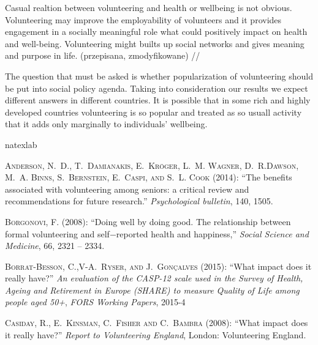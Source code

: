 \documentclass[10pt, letterpaper]{article}
\begin{document}
\begin{spacing}{1.4}
Casual realtion between volunteering  and health or wellbeing is not obvious. Volunteering may improve the employability of volunteers and it provides engagement in a socially meaningful role  what could positively impact on health and well-being. Volunteering might builts up social networks and gives meaning and purpose in life. (przepisana, zmodyfikowane) //

The question that must be asked is whether popularization of volunteering should be put into social policy agenda. Taking into consideration our results we expect different answers in different countries. It is possible that in some rich and highly developed countries volunteering is so popular and treated as so usuall activity that it adds only marginally to individuals' wellbeing. 

\begin{thebibliography}{87}
\newcommand{\enquote}[1]{``#1''}
\expandafter\ifx\csname natexlab\endcsname\relax\def\natexlab#1{#1}\fi

\textsc{Anderson, N.~D., T.~Damianakis, E.~Kr{\"o}ger, L.~M. Wagner, D.~R.Dawson, M.~A. Binns, S.~Bernstein, E.~Caspi, and S.~L. Cook} (2014):  \enquote{The benefits associated with volunteering among seniors: a critical  review and recommendations for future research.} \emph{Psychological bulletin}, 140, 1505.


\textsc{Borgonovi, F.} (2008): \enquote{Doing well by doing good. The relationship between formal volunteering and self$-$reported health and happiness,} \emph{Social Science and Medicine}, 66,  2321 -- 2334.

\textsc{Borrat-Besson, C.,V-A.~Ryser, and J.~Gonçalves} (2015):  \enquote{What impact does it really have?} \emph{An evaluation of the CASP-12 scale used in the Survey of Health, Ageing and Retirement in Europe (SHARE) to measure Quality of Life among people aged 50+}, \emph{FORS Working Papers}, 2015-4


\textsc{Casiday, R., E.~Kinsman, C.~Fisher and C.~Bambra} (2008):  \enquote{What impact does it really have?} \emph{Report to Volunteering England}, London: Volunteering England.


\end{thebibliography}
\end{spacing}
\end{document}
